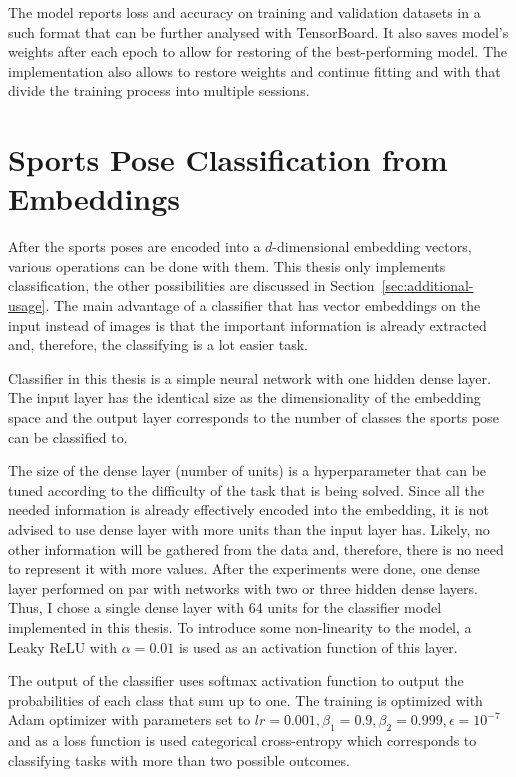 The model reports loss and accuracy on training and validation datasets in a such format that can be further analysed with TensorBoard. It also saves model's weights after each epoch to allow for restoring of the best-performing model. The implementation also allows to restore weights and continue fitting and with that divide the training process into multiple sessions.

\section{\label{sec:classifier}Sports Pose Classification from Embeddings}

After the sports poses are encoded into a $d$-dimensional embedding vectors, various operations can be done with them. This thesis only implements classification, the other possibilities are discussed in Section~\ref{sec:additional-usage}. The main advantage of a classifier that has vector embeddings on the input instead of images is that the important information is already extracted and, therefore, the classifying is a lot easier task.

Classifier in this thesis is a simple neural network with one hidden dense layer. The input layer has the identical size as the dimensionality of the embedding space and the output layer corresponds to the number of classes the sports pose can be classified to.

The size of the dense layer (number of units) is a hyperparameter that can be tuned according to the difficulty of the task that is being solved. Since all the needed information is already effectively encoded into the embedding, it is not advised to use dense layer with more units than the input layer has. Likely, no other information will be gathered from the data and, therefore, there is no need to represent it with more values. After the experiments were done, one dense layer performed on par with networks with two or three hidden dense layers. Thus, I chose a single dense layer with 64 units for the classifier model implemented in this thesis. To introduce some non-linearity to the model, a Leaky ReLU with $\alpha = 0.01$ is used as an activation function of this layer.

The output of the classifier uses softmax activation function to output the probabilities of each class that sum up to one. The training is optimized with Adam optimizer with parameters set to $lr = 0.001, \beta_1 = 0.9, \beta_2 = 0.999, \epsilon = 10^{-7}$ and as a loss function is used categorical cross-entropy which corresponds to classifying tasks with more than two possible outcomes.

